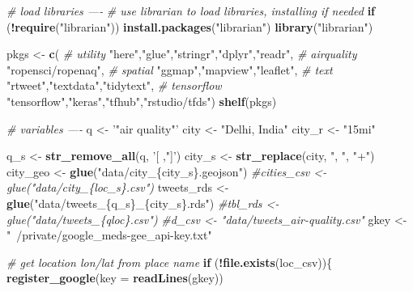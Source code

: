 \documentclass[]{book}
\newenvironment{Shaded}{\begin{snugshade}}{\end{snugshade}}
\newcommand{\CommentTok}[1]{\textcolor[rgb]{0.56,0.35,0.01}{\textit{#1}}}
\newcommand{\ControlFlowTok}[1]{\textcolor[rgb]{0.13,0.29,0.53}{\textbf{#1}}}
\newcommand{\DataTypeTok}[1]{\textcolor[rgb]{0.13,0.29,0.53}{#1}}
\newcommand{\KeywordTok}[1]{\textcolor[rgb]{0.13,0.29,0.53}{\textbf{#1}}}
\newcommand{\NormalTok}[1]{#1}
\newcommand{\OperatorTok}[1]{\textcolor[rgb]{0.81,0.36,0.00}{\textbf{#1}}}
\newcommand{\StringTok}[1]{\textcolor[rgb]{0.31,0.60,0.02}{#1}}
\begin{document}
\begin{Shaded}
\begin{Highlighting}[]
\CommentTok{# load libraries ----}
\CommentTok{# use librarian to load libraries, installing if needed}
\ControlFlowTok{if}\NormalTok{ (}\OperatorTok{!}\KeywordTok{require}\NormalTok{(}\StringTok{"librarian"}\NormalTok{)) }\KeywordTok{install.packages}\NormalTok{(}\StringTok{"librarian"}\NormalTok{)}
\KeywordTok{library}\NormalTok{(}\StringTok{"librarian"}\NormalTok{)}

\NormalTok{pkgs <-}\StringTok{ }\KeywordTok{c}\NormalTok{(}
  \CommentTok{# utility}
  \StringTok{"here"}\NormalTok{,}\StringTok{"glue"}\NormalTok{,}\StringTok{"stringr"}\NormalTok{,}\StringTok{"dplyr"}\NormalTok{,}\StringTok{"readr"}\NormalTok{,}
  \CommentTok{# airquality}
  \StringTok{"ropensci/ropenaq"}\NormalTok{,}
  \CommentTok{# spatial}
  \StringTok{"ggmap"}\NormalTok{,}\StringTok{"mapview"}\NormalTok{,}\StringTok{"leaflet"}\NormalTok{,}
  \CommentTok{# text}
  \StringTok{"rtweet"}\NormalTok{,}\StringTok{"textdata"}\NormalTok{,}\StringTok{"tidytext"}\NormalTok{,}
  \CommentTok{# tensorflow}
  \StringTok{"tensorflow"}\NormalTok{,}\StringTok{"keras"}\NormalTok{,}\StringTok{"tfhub"}\NormalTok{,}\StringTok{"rstudio/tfds"}\NormalTok{)}
\KeywordTok{shelf}\NormalTok{(pkgs)}

\CommentTok{# variables ----}
\NormalTok{q          <-}\StringTok{ '"air quality"'}
\NormalTok{city       <-}\StringTok{ "Delhi, India"}
\NormalTok{city_r     <-}\StringTok{ "15mi"}

\NormalTok{q_s        <-}\StringTok{ }\KeywordTok{str_remove_all}\NormalTok{(q, }\StringTok{'[ ,"]'}\NormalTok{)}
\NormalTok{city_s     <-}\StringTok{ }\KeywordTok{str_replace}\NormalTok{(city, }\StringTok{", "}\NormalTok{, }\StringTok{"+"}\NormalTok{)}
\NormalTok{city_geo   <-}\StringTok{ }\KeywordTok{glue}\NormalTok{(}\StringTok{"data/city_\{city_s\}.geojson"}\NormalTok{)}
\CommentTok{#cities_csv <- glue("data/city_\{loc_s\}.csv")}
\NormalTok{tweets_rds <-}\StringTok{ }\KeywordTok{glue}\NormalTok{(}\StringTok{"data/tweets_\{q_s\}_\{city_s\}.rds"}\NormalTok{)}
\CommentTok{#tbl_rds <- glue("data/tweets_\{qloc\}.csv")}
\CommentTok{#d_csv  <- "data/tweets_air-quality.csv"}
\NormalTok{gkey       <-}\StringTok{ "~/private/google_meds-gee_api-key.txt"}

\CommentTok{# get location lon/lat from place name}
\ControlFlowTok{if}\NormalTok{ (}\OperatorTok{!}\KeywordTok{file.exists}\NormalTok{(loc_csv))\{}
  \KeywordTok{register_google}\NormalTok{(}\DataTypeTok{key =} \KeywordTok{readLines}\NormalTok{(gkey))}


\end{Highlighting}
\end{Shaded}
\end{document}
